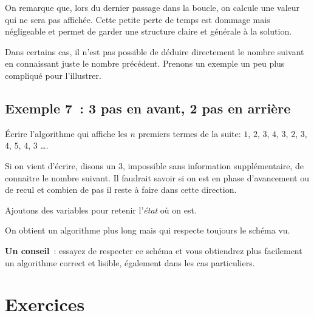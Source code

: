 On remarque que, lors du dernier passage dans la boucle,
on calcule une valeur qui ne sera pas affichée.
Cette petite perte de temps est dommage mais négligeable
et permet de garder une structure claire et générale à la solution.

Dans certains cas,
il n'est pas possible de déduire directement le nombre suivant
en connaissant juste le nombre précédent.
Prenons un exemple un peu plus compliqué pour l'illustrer.

\subsection{Exemple 7~: 3 pas en avant, 2 pas en arrière} 
	Écrire l'algorithme qui affiche les $n$ premiers termes
	de la suite: $1$, $2$, $3$, $4$, $3$, $2$, $3$, $4$, $5$, $4$, $3$ \dots.

Si on vient d'écrire, disons un $3$,
impossible sans information supplémentaire,
de connaitre le nombre suivant.
Il faudrait savoir si on est en phase d'avancement ou de recul
et combien de pas il reste à faire dans cette direction.

Ajoutons des variables pour retenir l'\emph{état} où on est.


On obtient un algorithme plus long 
mais qui respecte toujours le schéma vu.

\textbf{Un conseil}~: essayez de respecter ce schéma 
et vous obtiendrez plus facilement un algorithme
correct et lisible, également dans les cas particuliers.
		

\section{Exercices}

